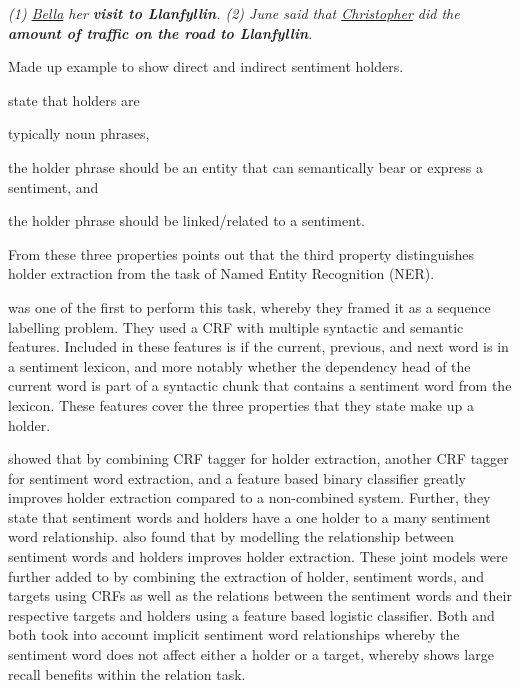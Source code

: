 \begin{example}
\textit{(1) \underline{Bella}  her \textbf{visit to Llanfyllin}. (2) June said that \underline{Christopher} did  the \textbf{amount of  traffic on the road to Llanfyllin}.}
\caption{Made up example to show direct and indirect sentiment holders.}
\label{example:lit_review_sentiment_holder_extraction_direct_indirect}
\end{example}

\citet{choi-etal-2005-identifying} state that holders are 
\begin{enumerate*}[label=\roman*)]
    \item typically noun phrases,
    \item the holder phrase should be an entity that can semantically bear or express a sentiment, and
    \item the holder phrase should be linked/related to a sentiment.
\end{enumerate*}
From these three properties \citet{choi-etal-2005-identifying} points out that the third property distinguishes holder extraction from the task of Named Entity Recognition (NER).

\citet{choi-etal-2005-identifying} was one of the first to perform this task, whereby they framed it as a sequence labelling problem. They used a CRF with multiple syntactic and semantic features. Included in these features is if the current, previous, and next word is in a sentiment lexicon, and more notably whether the dependency head of the current word is part of a syntactic chunk that contains a sentiment word from the lexicon. These features cover the three properties that they state make up a holder. 


\citet{choi-etal-2006-joint} showed that by combining \citet{choi-etal-2005-identifying} CRF tagger for holder extraction, another CRF tagger for sentiment word extraction, and a feature based binary classifier greatly improves holder extraction compared to a non-combined system. Further, they state that sentiment words and holders have a one holder to a many sentiment word relationship. \citet{johansson-moschitti-2010-reranking} also found that by modelling the relationship between sentiment words and holders improves holder extraction. These joint models were further added to by \citet{yang-cardie-2013-joint} combining the extraction of holder, sentiment words, and targets using CRFs as well as the relations between the sentiment words and their respective targets and holders using a feature based logistic classifier. Both \citet{johansson-moschitti-2010-reranking} and \citet{yang-cardie-2013-joint} both took into account implicit sentiment word relationships whereby the sentiment word does not affect either a holder or a target, whereby \citet{yang-cardie-2013-joint} shows large recall benefits within the relation task.

